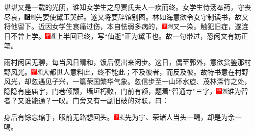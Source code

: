 {堪堪又是一载的光阴，谁知女学生之母贾氏夫人一疾而终。女学生侍汤奉药，守丧尽哀，{\includegraphics[width=3mm]{../Images/00006}\includegraphics[width=3mm]{../Images/00011}\footnotesize \kaishu 先要使黛玉哭起。}遂又将要辞馆别图。林如海意欲令女守制读书，故又将他留下。近因女学生哀痛过伤，本自怯弱多病的，{\includegraphics[width=3mm]{../Images/00002}\includegraphics[width=3mm]{../Images/00011}\footnotesize \kaishu 又一染。}触犯旧症，遂连日不曾上学。{\includegraphics[width=3mm]{../Images/00002}\includegraphics[width=3mm]{../Images/00010}\footnotesize \kaishu 上半回已终，写``仙逝''正为黛玉也。故一句带过，恐闲文有妨正笔。}

雨村闲居无聊，每当风日晴和，饭后便出来闲步。这日，偶至郭外，意欲赏鉴那村野风光。{\includegraphics[width=3mm]{../Images/00002}\includegraphics[width=3mm]{../Images/00010}\footnotesize \kaishu 大都世人意料此，终不能此；不及彼者，而反及彼。故特书意在村野风光，却忽遇见子兴，一篇荣国繁华气象。}忽信步至一山环水旋、茂林深竹之处，隐隐有座庙宇，门巷倾颓，墙垣朽败，门前有额，题着``智通寺''三字，{\includegraphics[width=3mm]{../Images/00002}\includegraphics[width=3mm]{../Images/00011}\footnotesize \kaishu 谁为智者？又谁能通？一叹。}门旁又有一副旧破的对联，曰：

身后有馀忘缩手，眼前无路想回头。{\includegraphics[width=3mm]{../Images/00002}\includegraphics[width=3mm]{../Images/00012}\footnotesize \kaishu 先为宁、荣诸人当头一喝，却是为余一喝。}

}
